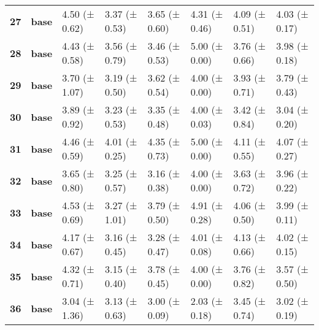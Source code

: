 \begin{longtable}{llllllll}
\cline{1-8}
\textbf{27} & \textbf{base} & 4.50 (± 0.62) & 3.37 (± 0.53) & 3.65 (± 0.60) & 4.31 (± 0.46) & 4.09 (± 0.51) & 4.03 (± 0.17) \\
\cline{1-8}
\textbf{28} & \textbf{base} & 4.43 (± 0.58) & 3.56 (± 0.79) & 3.46 (± 0.53) & 5.00 (± 0.00) & 3.76 (± 0.66) & 3.98 (± 0.18) \\
\cline{1-8}
\textbf{29} & \textbf{base} & 3.70 (± 1.07) & 3.19 (± 0.50) & 3.62 (± 0.54) & 4.00 (± 0.00) & 3.93 (± 0.71) & 3.79 (± 0.43) \\
\cline{1-8}
\textbf{30} & \textbf{base} & 3.89 (± 0.92) & 3.23 (± 0.53) & 3.35 (± 0.48) & 4.00 (± 0.03) & 3.42 (± 0.84) & 3.04 (± 0.20) \\
\cline{1-8}
\textbf{31} & \textbf{base} & 4.46 (± 0.59) & 4.01 (± 0.25) & 4.35 (± 0.73) & 5.00 (± 0.00) & 4.11 (± 0.55) & 4.07 (± 0.27) \\
\cline{1-8}
\textbf{32} & \textbf{base} & 3.65 (± 0.80) & 3.25 (± 0.57) & 3.16 (± 0.38) & 4.00 (± 0.00) & 3.63 (± 0.72) & 3.96 (± 0.22) \\
\cline{1-8}
\textbf{33} & \textbf{base} & 4.53 (± 0.69) & 3.27 (± 1.01) & 3.79 (± 0.50) & 4.91 (± 0.28) & 4.06 (± 0.50) & 3.99 (± 0.11) \\
\cline{1-8}
\textbf{34} & \textbf{base} & 4.17 (± 0.67) & 3.16 (± 0.45) & 3.28 (± 0.47) & 4.01 (± 0.08) & 4.13 (± 0.66) & 4.02 (± 0.15) \\
\cline{1-8}
\textbf{35} & \textbf{base} & 4.32 (± 0.71) & 3.15 (± 0.40) & 3.78 (± 0.45) & 4.00 (± 0.00) & 3.76 (± 0.82) & 3.57 (± 0.50) \\
\cline{1-8}
\textbf{36} & \textbf{base} & 3.04 (± 1.36) & 3.13 (± 0.63) & 3.00 (± 0.09) & 2.03 (± 0.18) & 3.45 (± 0.74) & 3.02 (± 0.19) \\
\cline{1-8}
\end{longtable}

